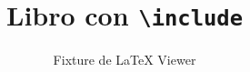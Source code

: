 \documentclass[11pt]{book}
\newcommand{\PortadaCompleta}{}
\begin{document}
\ifdefined\PortadaCompleta
\title{Libro con \texttt{\textbackslash include}}
\author{Fixture de LaTeX Viewer}
\maketitle
\tableofcontents
\fi




\end{document}

